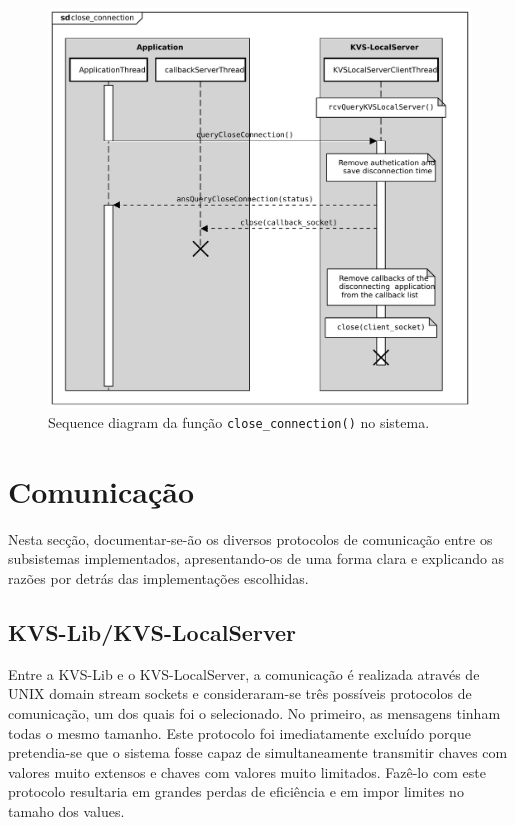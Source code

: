 \begin{figure}[H]
    \centering
    \includegraphics[width=0.7\linewidth]{figures/UML/close_connection.pdf}
    \caption{Sequence diagram da função \texttt{close\_connection()} no sistema.}
    \label{fig:sd_close_connection}
\end{figure}

\section{Comunicação}\label{sec:com}

Nesta secção, documentar-se-ão os diversos protocolos de comunicação entre os subsistemas implementados, apresentando-os de uma forma clara e explicando as razões por detrás das implementações escolhidas.

\subsection{KVS-Lib/KVS-LocalServer}\label{com:lib_local}


Entre a KVS-Lib e o KVS-LocalServer, a comunicação é realizada através de UNIX domain stream sockets e consideraram-se três possíveis protocolos de comunicação, um dos quais foi o selecionado. No primeiro, as mensagens tinham todas o mesmo tamanho. Este protocolo foi imediatamente excluído porque pretendia-se que o sistema fosse capaz de simultaneamente transmitir chaves com valores muito extensos e chaves com valores muito limitados. Fazê-lo com este protocolo resultaria em grandes perdas de eficiência e em impor limites no tamaho dos values.

